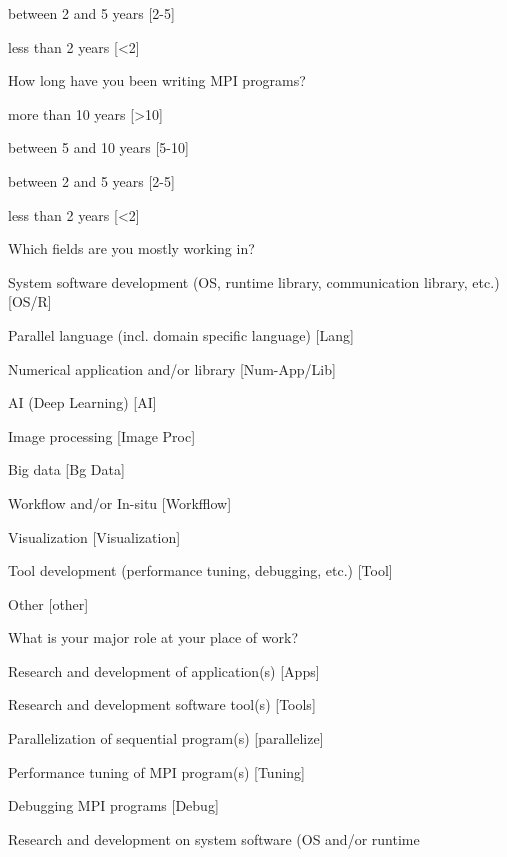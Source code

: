 \documentclass[conference,10pt,letterpaper]{IEEEtran}
\begin{document}
{{\begin{description}
\begin{inparaenum}[{\bf C}1)]
    \item between 2 and 5 years [2-5]
    \item less than 2 years [\textless 2]
    \end{inparaenum}
  \item[Q6:] How long have you been writing MPI programs?
    \begin{inparaenum}[{\bf C}1)]
    \item more than 10 years [\textgreater10]
    \item between 5 and 10 years [5-10]
    \item between 2 and 5 years [2-5]
    \item less than 2 years [\textless 2]
    \end{inparaenum}
  \item[Q7*:] Which fields are you mostly working in?
    \begin{inparaenum}[{\bf C}1)]
    \item System software development (OS, runtime library, communication
      library, etc.) [OS/R]
    \item Parallel language (incl. domain specific language) [Lang]
    \item Numerical application and/or library [Num-App/Lib]
    \item AI (Deep Learning) [AI]
    \item Image processing [Image Proc]
    \item Big data [Bg Data]
    \item Workflow and/or In-situ [Workfflow]
    \item Visualization [Visualization]
    \item Tool development (performance tuning, debugging, etc.) [Tool]
    \item Other [other]
    \end{inparaenum}
  \item[Q8*:] What is your major role at your place of work?
    \begin{inparaenum}[{\bf C}1)]
    \item Research and development of application(s) [Apps]
    \item Research and development software tool(s) [Tools]
    \item Parallelization of sequential program(s) [parallelize]
    \item Performance tuning of MPI program(s) [Tuning]
    \item Debugging MPI programs [Debug]
    \item Research and development on system software (OS and/or runtime

\end{inparaenum}
\end{description}}}
\end{document}
